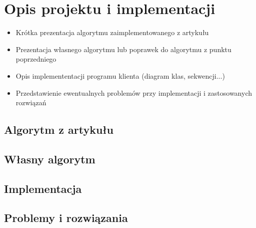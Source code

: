 \chapter{Opis projektu i implementacji}
\label{cha:rozdzial5}

\begin{itemize}
\item Krótka prezentacja algorytmu zaimplementowanego z artykułu 
\item Prezentacja własnego algorytmu lub poprawek do algorytmu z punktu poprzedniego
\item Opis implemententacji programu klienta (diagram klas, sekwencji...)
\item Przedstawienie ewentualnych problemów przy implementacji i zastosowanych rozwiązań
\end{itemize}

\section{Algorytm z artykułu}

\section{Własny algorytm}

\section{Implementacja}

\section{Problemy i rozwiązania}